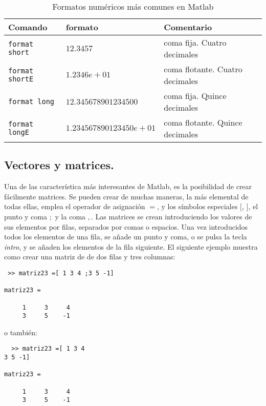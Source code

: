 \begin{table}[h]
\caption{Formatos numéricos más comunes en Matlab}
\begin{tabular}{l l l }
\textbf{Comando} & \textbf{formato} & \textbf{Comentario}\\ \hline
\texttt{format short} & $12.3457$ & coma fija. Cuatro decimales\\
\texttt{format shortE} & $1.2346e+01$ & coma flotante. Cuatro decimales\\
\texttt{format long} & $12.345678901234500$ & coma fija. Quince decimales\\
\texttt{format longE} & $1.234567890123450e+01$ & coma flotante. Quince decimales\\ \hline 
\end{tabular}
\end{table}
\subsection{Vectores y matrices.}   Una de las característica más interesantes de Matlab, es la posibilidad de crear fácilmente matrices. Se pueden crear de muchas maneras, la más elemental de todas ellas, emplea el operador de asignación $=$, y los símbolos especiales $[$, $]$, el punto y coma $;$ y la coma $,$. Las matrices se crean introduciendo los valores de sus elementos por filas, separados por comas o espacios. Una vez introducidos todos los elementos de una fila, se añade un punto y coma, o se pulsa la tecla \emph{intro}, y se añaden los elementos de la fila siguiente. El siguiente ejemplo muestra como crear una matriz de de dos filas y tres columnas:
\begin{verbatim}
 >> matriz23 =[ 1 3 4 ;3 5 -1]

matriz23 =

     1     3     4
     3     5    -1
\end{verbatim}
o también:
 \begin{verbatim}
  >> matriz23 =[ 1 3 4 
3 5 -1]

matriz23 =

     1     3     4
     3     5    -1
 \end{verbatim}

